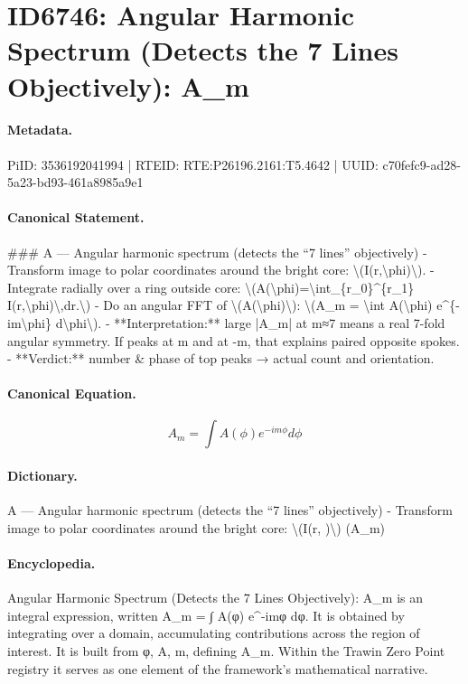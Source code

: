 \section*{ID6746: Angular Harmonic Spectrum (Detects the 7 Lines Objectively): A\_m}
\paragraph{Metadata.}
PiID: 3536192041994 | RTEID: RTE:P26196.2161:T5.4642 | UUID: c70fefc9-ad28-5a23-bd93-461a8985a9e1

\paragraph{Canonical Statement.}
\#\#\# A — Angular harmonic spectrum (detects the “7 lines” objectively) - Transform image to polar coordinates around the bright core: \textbackslash{}(I(r,\textbackslash{}phi)\textbackslash{}). - Integrate radially over a ring outside core: \textbackslash{}(A(\textbackslash{}phi)=\textbackslash{}int\_\{r\_0\}\textasciicircum{}\{r\_1\} I(r,\textbackslash{}phi)\textbackslash{},dr.\textbackslash{}) - Do an angular FFT of \textbackslash{}(A(\textbackslash{}phi)\textbackslash{}): \textbackslash{}(A\_m = \textbackslash{}int A(\textbackslash{}phi) e\textasciicircum{}\{-im\textbackslash{}phi\} d\textbackslash{}phi\textbackslash{}). - **Interpretation:** large |A\_m| at m≈7 means a real 7-fold angular symmetry. If peaks at m and at -m, that explains paired opposite spokes. - **Verdict:** number \& phase of top peaks → actual count and orientation.

\paragraph{Canonical Equation.}
\[
A_m = \int A(\phi) e^{-im\phi} d\phi
\]

\paragraph{Dictionary.}
A — Angular harmonic spectrum (detects the “7 lines” objectively) - Transform image to polar coordinates around the bright core: \textbackslash{}(I(r, )\textbackslash{}) (A\_m)

\paragraph{Encyclopedia.}
Angular Harmonic Spectrum (Detects the 7 Lines Objectively): A\_m is an integral expression, written A\_m = ∫ A(φ) e\textasciicircum{}-imφ dφ. It is obtained by integrating over a domain, accumulating contributions across the region of interest. It is built from φ, A, m, defining A\_m. Within the Trawin Zero Point registry it serves as one element of the framework's mathematical narrative.
